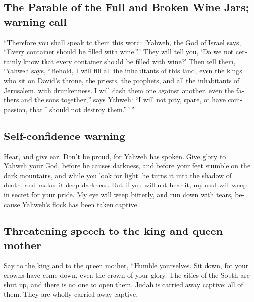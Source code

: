 \begin{paracol}{2}
\begin{otherlanguage}{english}
\hypertarget{the-parable-of-the-full-and-broken-wine-jars-warning-call}{%
\subsection{The Parable of the Full and Broken Wine Jars; warning
call}\label{the-parable-of-the-full-and-broken-wine-jars-warning-call}}

 ``Therefore you shall speak to them this word: `Yahweh,
the God of Israel says, ``Every container should be filled with
wine.''\,' They will tell you, `Do we not certainly know that every
container should be filled with wine?'  Then tell them,
`Yahweh says, ``Behold, I will fill all the inhabitants of this land,
even the kings who sit on David's throne, the priests, the prophets, and
all the inhabitants of Jerusalem, with drunkenness.  I
will dash them one against another, even the fathers and the sons
together,'' says Yahweh: ``I will not pity, spare, or have compassion,
that I should not destroy them.''\,'\,''

\hypertarget{self-confidence-warning}{%
\subsection{Self-confidence warning}\label{self-confidence-warning}}

 Hear, and give ear. Don't be proud, for Yahweh has
spoken.  Give glory to Yahweh your God, before he causes
darkness, and before your feet stumble on the dark mountains, and while
you look for light, he turns it into the shadow of death, and makes it
deep darkness.  But if you will not hear it, my soul will
weep in secret for your pride. My eye will weep bitterly, and run down
with tears, because Yahweh's flock has been taken captive.

\hypertarget{threatening-speech-to-the-king-and-queen-mother}{%
\subsection{Threatening speech to the king and queen
mother}\label{threatening-speech-to-the-king-and-queen-mother}}

 Say to the king and to the queen mother, ``Humble
yourselves. Sit down, for your crowns have come down, even the crown of
your glory.  The cities of the South are shut up, and
there is no one to open them. Judah is carried away captive: all of
them. They are wholly carried away captive.


\end{otherlanguage}
\end{paracol}
